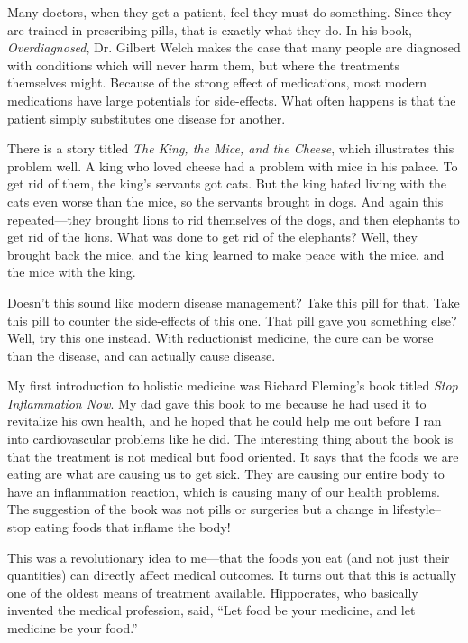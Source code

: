 Many doctors, when they get a patient, feel they must do something.
Since they are trained in prescribing pills, that is exactly what they
do.  In his book, \textit{Overdiagnosed}, Dr. Gilbert Welch makes the
case that many people are diagnosed with conditions which will never
harm them, but where the treatments themselves might.  Because of the
strong effect of medications, most modern medications have large
potentials for side-effects. What often happens is that the patient
simply substitutes one disease for another. 

There is a story titled \textit{The King, the Mice, and the Cheese},
which illustrates this problem well. A king who loved cheese had a
problem with mice in his palace. To get rid of them, the
king's servants got cats. But the king hated living
with the cats even worse than the mice, so the servants brought in
dogs. And again this repeated—they brought lions to rid themselves of
the dogs, and then elephants to get rid of the lions. What was done to
get rid of the elephants?  Well, they brought back the mice, and the
king learned to make peace with the mice, and the mice with the king.

Doesn't this sound like modern disease management? 
Take this pill for that. Take this pill to counter the side-effects of
this one. That pill gave you something else?  Well, try this one
instead. With reductionist medicine, the cure can be worse than the
disease, and can actually cause disease.

My first introduction to holistic medicine was Richard
Fleming's book titled \textit{Stop Inflammation Now}.
My dad gave this book to me because he had used it to revitalize his
own health, and he hoped that he could help me out before I ran into
cardiovascular problems like he did. The interesting thing about the
book is that the treatment is not medical but food oriented. It says
that the foods we are eating are what are causing us to get sick. They
are causing our entire body to have an inflammation reaction, which is
causing many of our health problems. The suggestion of the book was not
pills or surgeries but a change in lifestyle–stop eating foods that
inflame the body!

This was a revolutionary idea to me—that the foods you eat (and not just
their quantities) can directly affect medical outcomes. It turns out
that this is actually one of the oldest means of treatment available.
Hippocrates, who basically invented the medical profession, said,
``Let food be your medicine, and let medicine be your
food.'' 


